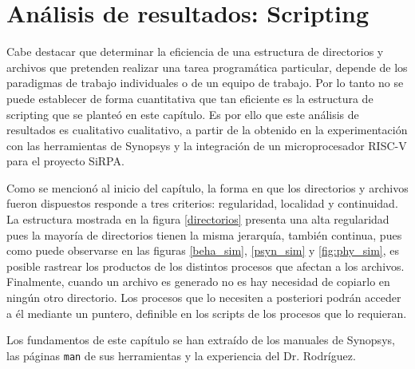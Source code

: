 \newpage

\section{Análisis de resultados: Scripting }

Cabe destacar que determinar la eficiencia de una estructura de directorios y archivos que pretenden realizar una tarea programática particular, depende de los paradigmas de trabajo individuales o de un equipo de trabajo. Por lo tanto no se puede establecer de forma cuantitativa que tan eficiente es la estructura de scripting que se planteó en este capítulo. Es por ello que este análisis de resultados es cualitativo cualitativo, a partir de la obtenido en la experimentación con las herramientas de Synopsys y la integración de un microprocesador RISC-V para el proyecto SiRPA.

Como se mencionó al inicio del capítulo, la forma en que los directorios y archivos fueron dispuestos responde a tres criterios: regularidad, localidad y continuidad. La estructura mostrada en la figura \ref{directorios} presenta una alta regularidad pues la mayoría de directorios tienen la misma jerarquía, también continua, pues como puede observarse en las figuras \ref{beha_sim}, \ref{psyn_sim} y \ref{fig:phy_sim}, es posible rastrear los productos de los distintos procesos que afectan a los archivos. Finalmente, cuando un archivo es generado no es hay necesidad de copiarlo en ningún otro directorio. Los procesos que lo necesiten a posteriori podrán acceder a él mediante un puntero, definible en los scripts de los procesos que lo requieran.

Los fundamentos de este capítulo se han extraído de los manuales de Synopsys, las páginas \texttt{man} de sus herramientas y la experiencia del Dr. Rodríguez.